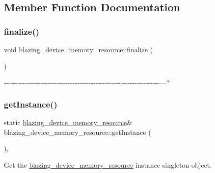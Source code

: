 \subsection{Member Function Documentation}
\mbox{\label{classblazing__device__memory__resource_ab92679fbcfe6a6075be76d3026e19b47}} 
\subsubsection{\texorpdfstring{finalize()}{finalize()}}
{\footnotesize\ttfamily void blazing\+\_\+device\+\_\+memory\+\_\+resource\+::finalize (\begin{DoxyParamCaption}{ }\end{DoxyParamCaption})}





-\/-\/-\/-\/-\/-\/-\/-\/-\/-\/-\/-\/-\/-\/-\/-\/-\/-\/-\/-\/-\/-\/-\/-\/-\/-\/-\/-\/-\/-\/-\/-\/-\/-\/-\/-\/-\/-\/-\/-\/-\/-\/-\/-\/-\/-\/-\/-\/-\/-\/-\/-\/-\/-\/-\/-\/-\/-\/-\/-\/-\/-\/-\/-\/-\/-\/-\/-\/---$\ast$ \mbox{\label{classblazing__device__memory__resource_a31735d61d23aef05666c7c3f981c86fe}} 
\subsubsection{\texorpdfstring{get\+Instance()}{getInstance()}}
{\footnotesize\ttfamily static \hyperlink{classblazing__device__memory__resource}{blazing\+\_\+device\+\_\+memory\+\_\+resource}\& blazing\+\_\+device\+\_\+memory\+\_\+resource\+::get\+Instance (\begin{DoxyParamCaption}{ }\end{DoxyParamCaption})\hspace{0.3cm}{\ttfamily [inline]}, {\ttfamily [static]}}



Get the \hyperlink{classblazing__device__memory__resource}{blazing\+\_\+device\+\_\+memory\+\_\+resource} instance singleton object. 

